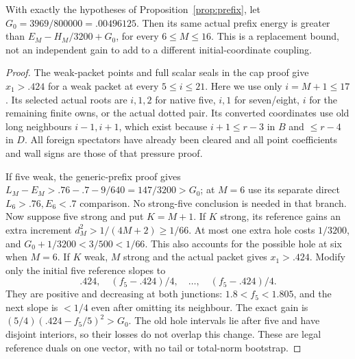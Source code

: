 \begin{lemma}
\label{app:tail:lem:prefixgain}
With exactly the hypotheses of Proposition~\ref{prop:prefix}, let
$G_0=3969/800000=.00496125$. Then its same actual prefix energy is
greater than $E_M-H_M/3200+G_0$, for every $6\le M\le16$.
This is a replacement bound, not an independent gain to add to a
different initial-coordinate coupling.
\end{lemma}
\begin{proof}
The weak-packet points and full scalar seals in the cap proof give
$x_1>.424$ for a weak packet at every $5\le i\le21$.
Here we use only $i=M+1\le17$. Its selected actual roots are
$i,1,2$ for native five, $i,1$ for seven/eight, $i$ for the
remaining finite owns, or the actual dotted pair. Its converted
coordinates use old long neighbours $i-1,i+1$, which exist because
$i+1\le r-3$ in $B$ and $\le r-4$ in $D$.
All foreign spectators have already been cleared and all point
coefficients and wall signs are those of that pressure proof.

If five weak, the generic-prefix proof gives
$L_M-E_M>.76-.7-9/640=147/3200>G_0$; at $M=6$ use its
separate direct $L_6>.76,E_6<.7$ comparison. No strong-five
conclusion is needed in that branch.
Now suppose five strong and put $K=M+1$.
If $K$ strong, its reference gains an extra increment
$d_M^2>1/(4M+2)\ge1/66$. At most one extra hole costs
$1/3200$, and $G_0+1/3200<3/500<1/66$.
This also accounts for the possible hole at six when $M=6$.
If $K$ weak, $M$ strong and the actual packet gives $x_1>.424$.
Modify only the initial five reference slopes to
\[
 .424,\quad(f_5-.424)/4,\quad\ldots,\quad(f_5-.424)/4.
\]
They are positive and decreasing at both junctions: $1.8<f_5<1.805$,
and the next slope is $<1/4$ even after omitting its neighbour.
The exact gain is $(5/4)(.424-f_5/5)^2>G_0$.
The old hole intervals lie after five and have disjoint interiors,
so their losses do not overlap this change. These are legal reference
duals on one vector, with no tail or total-norm bootstrap.
\end{proof}

